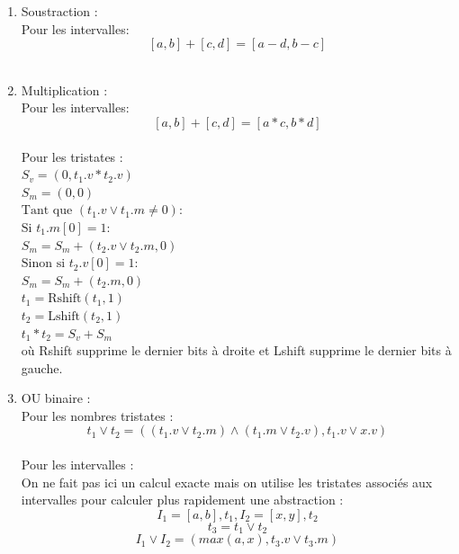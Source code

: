 \documentclass[a4paper,french, 12pt]{article}
\begin{document}
\begin{enumerate}
\begin{enumerate}
			\item Soustraction :\\
			Pour les intervalles:
			$$[a,b] + [c,d] = [a-d, b-c]$$\\

			\item Multiplication :\\
			Pour les intervalles:
			$$[a,b] + [c,d] = [a*c, b*d]$$\\

			Pour les tristates :\\
			\hspace*{6cm}$S_v = (0 , t_1.v*t_2.v)$\\
			\hspace*{6cm}$S_m = (0 , 0)$\\
			\hspace*{6cm}$\text{Tant que }(t_1.v \lor t_1.m \neq 0) : $\\
			\hspace*{7cm} $\text{Si } t_1.m[0] = 1 :$\\
			\hspace*{8cm} $ S_m = S_m + (t_2.v \lor t_2.m , 0) $\\
			\hspace*{7cm} $\text{Sinon si } t_2.v[0] = 1 :$\\
			\hspace*{8cm} $ S_m = S_m + (t_2.m , 0) $\\
			\hspace*{7cm} $t_1 = \text{Rshift}(t_1,1) $\\
			\hspace*{7cm} $t_2 =\text{Lshift}(t_2,1) $\\
			\hspace*{6cm}$t_1 * t_2 = S_v + S_m$\\

			où Rshift supprime le dernier bits à droite et Lshift supprime le dernier bits à gauche.\\

			\item OU binaire :\\
			Pour les nombres tristates : 
			$$ t_1 \lor t_2 = ((t_1.v \lor t_2.m) \land (t_1.m \lor t_2.v),t_1.v \lor x.v)$$\\
			Pour les intervalles :\\
			On ne fait pas ici un calcul exacte mais on utilise les tristates associés aux intervalles pour calculer plus rapidement une abstraction :
			$$ I_1 = [a,b], t_1, I_2 = [x,y], t_2 $$
			$$ t_3 = t_1 \lor t_2 $$ 
			$$ I_1 \lor I_2 = (max(a,x), t_3.v \lor t_3.m)$$


\end{enumerate}
\end{enumerate}
\end{document}
